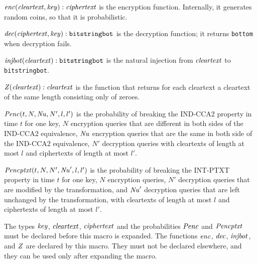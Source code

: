 \documentclass{article}
\begin{document}
\begin{itemize}
   $\mathit{enc}(\mathit{cleartext}, \mathit{key}): \mathit{ciphertext}$ is the encryption function. Internally, it generates random coins, so that it is probabilistic.

   $\mathit{dec}(\mathit{ciphertext}, \mathit{key}): \texttt{bitstringbot}$ is the
  decryption function; it returns \texttt{bottom} when decryption
  fails.

   $\mathit{injbot}(\mathit{cleartext}): \texttt{bitstringbot}$ is the natural
  injection from $\mathit{cleartext}$ to \texttt{bitstringbot}.

   $\mathit{Z}(\mathit{cleartext}): \mathit{cleartext}$ is the function that
  returns for each cleartext a cleartext of the same length consisting
  only of zeroes.

  $\mathit{Penc}(t, N, \mathit{Nu}, N', l, l')$ is the probability of breaking the
  IND-CCA2 property in time $t$ for one key, $N$ encryption queries that are 
  different in both sides of the IND-CCA2 equivalence, 
  $\mathit{Nu}$ encryption queries that are the same in both side of the IND-CCA2 equivalence, $N'$
  decryption queries with cleartexts of length at most $l$ and
  ciphertexts of length at most $l'$.

  $\mathit{Pencptxt}(t, N, N', \mathit{Nu}', l, l')$ is the probability of breaking the
  INT-PTXT property in time $t$ for one key, $N$ encryption queries, $N'$
  decryption queries that are modified by the transformation, and 
  $\mathit{Nu}'$ decryption queries that are left unchanged by the transformation,
  with cleartexts of length at most $l$ and
  ciphertexts of length at most $l'$.

   The types $\mathit{key}$, $\mathit{cleartext}$,
   $\mathit{ciphertext}$ and the probabilities $\mathit{Penc}$ and $\mathit{Pencptxt}$ must
   be declared before this macro is expanded. The functions
   $\mathit{enc}$, $\mathit{dec}$, $\mathit{injbot}$, and $\mathit{Z}$ are declared by this
   macro. They must not be declared elsewhere, and they can be used
   only after expanding the macro.


\end{itemize}
\end{document}
